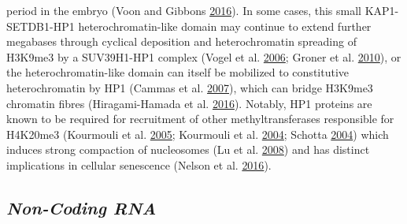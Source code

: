 \documentclass[onehalf,12pt]{beavtex}
\begin{document}
  period in the embryo (Voon and Gibbons
  \protect\hyperlink{ref-VoonMaintainingmemorysilencing2016}{2016}). In
  some cases, this small KAP1-SETDB1-HP1 heterochromatin-like domain may
  continue to extend further megabases through cyclical deposition and
  heterochromatin spreading of H3K9me3 by a SUV39H1-HP1 complex (Vogel et
  al. \protect\hyperlink{ref-VogelHumanheterochromatinproteins2006}{2006};
  Groner et al. \protect\hyperlink{ref-GronerKRABzincfinger2010}{2010}),
  or the heterochromatin-like domain can itself be mobilized to
  constitutive heterochromatin by HP1 (Cammas et al.
  \protect\hyperlink{ref-CammasDynamicselectiveinteractions2007}{2007}),
  which can bridge H3K9me3 chromatin fibres (Hiragami-Hamada et al.
  \protect\hyperlink{ref-Hiragami-HamadaDynamicflexibleH3K9me32016}{2016}).
  Notably, HP1 proteins are known to be required for recruitment of other
  methyltransferases responsible for H4K20me3 (Kourmouli et al.
  \protect\hyperlink{ref-KourmouliEpigeneticregulationmammalian2005}{2005};
  Kourmouli et al.
  \protect\hyperlink{ref-KourmouliHeterochromatintrimethylatedlysine2004}{2004};
  Schotta \protect\hyperlink{ref-Schottasilencingpathwayinduce2004}{2004})
  which induces strong compaction of nucleosomes (Lu et al.
  \protect\hyperlink{ref-LueffectH3K79dimethylation2008}{2008}) and has
  distinct implications in cellular senescence (Nelson et al.
  \protect\hyperlink{ref-NelsonMappingH4K20me3chromatin2016}{2016}).
  
  \subsection*{\texorpdfstring{\emph{Non-Coding
  RNA}}{Non-Coding RNA}}\label{non-coding-rna}
  
\end{document}

